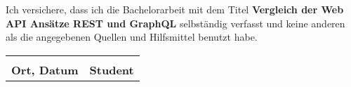 Ich versichere, dass ich die Bachelorarbeit mit dem Titel {\bfseries Vergleich der Web API Ansätze REST und GraphQL} selbständig verfasst und keine anderen als die angegebenen Quellen und Hilfsmittel benutzt habe.
\vspace{2cm}
\begin{table}[h]
	\centering
	\begin{tabularx}{\textwidth}{ Y Y }
		\dotfill & \dotfill \\
		{\textbf{Ort, Datum}}            & {\textbf{Student}}               \\
	\end{tabularx}
\end{table}